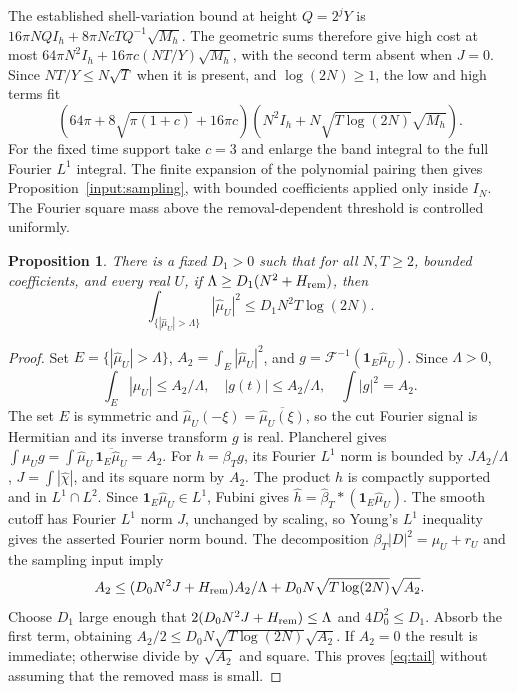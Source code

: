 \documentclass[11pt,a4paper,oneside]{article}
\newtheorem{proposition}[theorem]{Proposition}
\theoremstyle{definition}
\newcommand{\one}{\mathbf 1}
\newcommand{\Hhat}{\widehat}
\numberwithin{equation}{section}
\begin{document}
The established shell-variation bound at height $Q=2^jY$ is
$16\pi NQI_h+8\pi NcTQ^{-1}\sqrt{M_h}$.
The geometric sums therefore give high cost at most
$64\pi N^2I_h+16\pi c(NT/Y)\sqrt{M_h}$, with the second term absent
when $J=0$. Since $NT/Y\le N\sqrt T$ when it is present, and
$\log(2N)\ge1$, the low and high terms fit
\[
 (64\pi+8\sqrt{\pi(1+c)}+16\pi c)
      \left(N^2I_h+N\sqrt{T\log(2N)}\sqrt{M_h}\right).
\]
For the fixed time support take $c=3$ and enlarge the band integral to the
full Fourier $L^1$ integral. The finite expansion of the polynomial pairing
then gives Proposition~\ref{input:sampling}, with bounded coefficients applied
only inside $I_N$.
The Fourier square mass above the removal-dependent threshold is controlled uniformly.
\begin{proposition}\label{prop:tail}
There is a fixed $D_1>0$ such that for all $N,T\ge2$, bounded coefficients, and every real $U$, if
$\Lambda\ge D_1(N^2+H_{\rm rem})$, then
\begin{equation}\label{eq:tail}
 \int_{\{|\Hhat\mu_U|>\Lambda\}}|\Hhat\mu_U|^2
       \le D_1N^2T\log(2N).
\end{equation}
\end{proposition}
\begin{proof}
Set $E=\{|\Hhat\mu_U|>\Lambda\}$, $A_2=\int_E|\Hhat\mu_U|^2$, and
$g=\mathcal F^{-1}(\one_E\Hhat\mu_U)$. Since $\Lambda>0$,
\[
 \int_E|\Hhat\mu_U|\le A_2/\Lambda,\quad
 |g(t)|\le A_2/\Lambda,\quad\int|g|^2=A_2.
\]
The set $E$ is symmetric and $\widehat\mu_U(-\xi)=\overline{\widehat\mu_U(\xi)}$, so the cut Fourier signal is Hermitian and its inverse transform $g$ is real. Plancherel gives $\int\mu_Ug=\int\widehat\mu_U\,\overline{\one_E\widehat\mu_U}=A_2$. For
$h=\beta_Tg$, its Fourier $L^1$ norm is bounded by
$J A_2/\Lambda$, $J=\int|\Hhat\chi|$, and its square norm by $A_2$.
The product $h$ is compactly supported and in $L^1\cap L^2$. Since $\one_E\widehat\mu_U\in L^1$, Fubini gives $\widehat h=\widehat\beta_T*(\one_E\widehat\mu_U)$. The smooth cutoff has Fourier $L^1$ norm $J$, unchanged by scaling, so Young's $L^1$ inequality gives the asserted Fourier norm bound. The decomposition $\beta_T|D|^2=\mu_U+r_U$ and the sampling
input imply
\[
 A_2\le (D_0N^2J+H_{\rm rem})A_2/\Lambda
           +D_0N\sqrt{T\log(2N)}\sqrt{A_2}.
\]
Choose $D_1$ large enough that
$2(D_0N^2J+H_{\rm rem})\le\Lambda$ and $4D_0^2\le D_1$.
Absorb the first term, obtaining
$A_2/2\le D_0N\sqrt{T\log(2N)}\sqrt{A_2}$.
If $A_2=0$ the result is immediate; otherwise divide by $\sqrt{A_2}$ and
square. This proves \eqref{eq:tail} without assuming that the removed mass
is small.
\end{proof}
\end{document}
